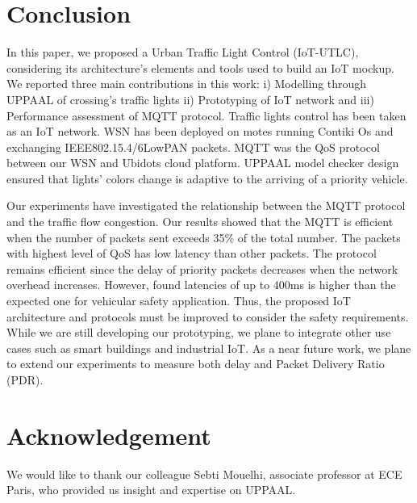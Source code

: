\documentclass[conference]{../../setup/IEEEtran}
\begin{document}
\section{Conclusion} \label{Sec:Conclusion}

In this paper, we proposed a Urban Traffic Light Control (IoT-UTLC), considering its architecture’s elements and tools used to build an IoT mockup.
We reported three main contributions in this work: i) Modelling through UPPAAL of crossing's traffic lights ii) Prototyping of IoT network and iii) Performance assessment of MQTT protocol. Traffic lights control has been taken as an IoT network. WSN has been deployed on motes running Contiki Os and exchanging IEEE802.15.4/6LowPAN packets. MQTT was the QoS protocol between our WSN and Ubidots cloud platform. UPPAAL model checker design ensured that lights' colors change is adaptive to the arriving of a priority vehicle.

Our experiments have investigated the relationship between the MQTT protocol and the traffic flow congestion. Our results showed that the MQTT is efficient when the number of packets sent exceeds 35\% of the total number. The packets with highest level of QoS has low latency than other packets. The protocol remains efficient since the delay of priority packets decreases when the network overhead increases. However, found latencies of up to 400ms is higher than the expected one for vehicular safety application. Thus, the proposed IoT architecture and protocols must be improved to consider the safety requirements. 
While we are still developing our prototyping, we plane to integrate other use cases such as smart buildings and industrial IoT.
As a near future work, we plane to extend our experiments to measure both delay and Packet Delivery Ratio (PDR).

\section*{Acknowledgement}

We would like to thank our colleague Sebti Mouelhi, associate professor at ECE Paris, who provided us insight and expertise on UPPAAL.







\end{document}
